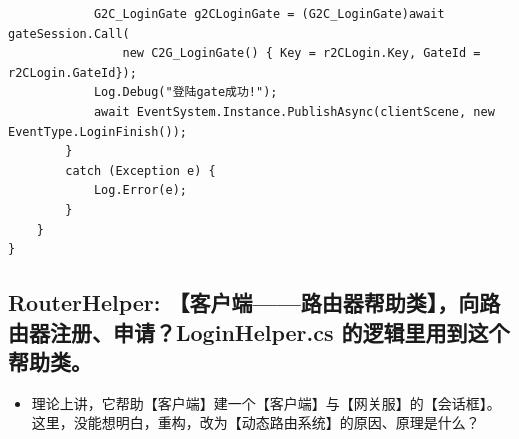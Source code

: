 \documentclass[9pt, b5paper]{article}
\begin{document}
\begin{verbatim}
            G2C_LoginGate g2CLoginGate = (G2C_LoginGate)await gateSession.Call(
                new C2G_LoginGate() { Key = r2CLogin.Key, GateId = r2CLogin.GateId});
            Log.Debug("登陆gate成功!");
            await EventSystem.Instance.PublishAsync(clientScene, new EventType.LoginFinish());
        }
        catch (Exception e) {
            Log.Error(e);
        }
    } 
}
\end{verbatim}
\subsection{RouterHelper: 【客户端——路由器帮助类】，向路由器注册、申请？LoginHelper.cs 的逻辑里用到这个帮助类。}
\label{sec:orgf78fce2}
\begin{itemize}
\item 理论上讲，它帮助【客户端】建一个【客户端】与【网关服】的【会话框】。这里，没能想明白，重构，改为【动态路由系统】的原因、原理是什么？
\end{itemize}
\end{document}
